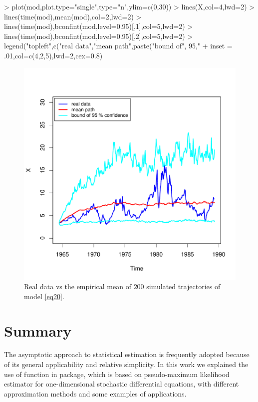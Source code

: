 \begin{Schunk}
\begin{Sinput}
> plot(mod,plot.type="single",type="n",ylim=c(0,30))
> lines(X,col=4,lwd=2)
> lines(time(mod),mean(mod),col=2,lwd=2)
> lines(time(mod),bconfint(mod,level=0.95)[,1],col=5,lwd=2)
> lines(time(mod),bconfint(mod,level=0.95)[,2],col=5,lwd=2)
> legend("topleft",c("real data","mean path",paste("bound of", 95,"%
+        inset = .01,col=c(4,2,5),lwd=2,cex=0.8)
\end{Sinput}
\end{Schunk}
\begin{figure}[!ht]
\begin{center}
\includegraphics{FitSDE-026}
\end{center}
\caption{Real data vs the empirical mean of $200$ simulated trajectories of model \eqref{eq20}.}\label{fig2}
\end{figure}

\section{Summary}
The asymptotic approach to statistical estimation is frequently adopted because of its general applicability and relative simplicity. In this work we explained the use of  function in  package, which is based on pseudo-maximum likelihood estimator for one-dimensional stochastic differential equations, with different approximation methods and some examples of applications.

